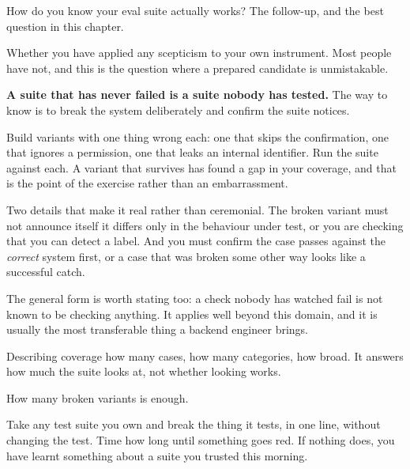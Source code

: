 \begin{bankq}{How do you know your eval suite actually works?}
\qasked
The follow-up, and the best question in this chapter.

\qtested
Whether you have applied any scepticism to your own instrument. Most people
have not, and this is the question where a prepared candidate is unmistakable.

\qstaff
\textbf{A suite that has never failed is a suite nobody has tested.} The way to
know is to break the system deliberately and confirm the suite notices.

Build variants with one thing wrong each: one that skips the confirmation, one
that ignores a permission, one that leaks an internal identifier. Run the suite
against each. A variant that survives has found a gap in your coverage, and
that is the point of the exercise rather than an embarrassment.

Two details that make it real rather than ceremonial. The broken variant must
not announce itself \dash{} it differs only in the behaviour under test, or you
are checking that you can detect a label. And you must confirm the case passes
against the \emph{correct} system first, or a case that was broken some other
way looks like a successful catch.


The general form is worth stating too: a check nobody has watched fail is not
known to be checking anything. It applies well beyond this domain, and it is
usually the most transferable thing a backend engineer brings.

\qsenior
Describing coverage \dash{} how many cases, how many categories, how broad. It
answers how much the suite looks at, not whether looking works.

\qcontested
How many broken variants is enough. 

\qdrill
Take any test suite you own and break the thing it tests, in one line, without
changing the test. Time how long until something goes red. If nothing does, you
have learnt something about a suite you trusted this morning.
\end{bankq}

